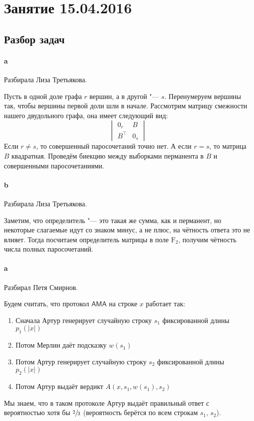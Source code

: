 \chapter{Занятие 15.04.2016}

\section{Разбор задач}
	\subsubsection{a}
	Разбирала Лиза Третьякова.

	Пусть в одной доле графа $r$ вершин, а в другой "--- $s$.
	Перенумеруем вершины так, чтобы вершины первой доли шли в начале.
	Рассмотрим матрицу смежности нашего двудольного графа, она имеет следующий вид:
	\[
		\begin{vmatrix}
			0_r & B \\
			B^{\top} & 0_s
		\end{vmatrix}
	\]
	Если $r\neq s$, то совершенный паросочетаний точно нет.
	А если $r=s$, то матрица $B$ квадратная.
	Проведём биекцию между выборками перманента в $B$ и совершенными паросочетаниями.
	\TODO

	\subsubsection{b}
	Разбирала Лиза Третьякова.

	Заметим, что определитель "--- это такая же сумма, как и перманент, но некоторые слагаемые
	идут со знаком минус, а не плюс, на чётность ответа это не влияет.
	Тогда посчитаем определитель матрицы в поле $\mathrm{F}_2$, получим чётность числа полных паросочетаний.

	\subsubsection{a}
	Разбирал Петя Смирнов.

	Будем считать, что протокол $\mathsf{AMA}$ на строке $x$ работает так:
	\begin{enumerate}
		\item
			Сначала Артур генерирует случайную строку $s_1$ фиксированной длины $p_1(|x|)$
		\item
			Потом Мерлин даёт подсказку $w(s_1)$
		\item
			Потом Артур генерирует случайную строку $s_2$ фиксированной длины $p_2(|x|)$
		\item
			Потом Артур выдаёт вердикт $A(x, s_1, w(s_1), s_2)$
	\end{enumerate}
	Мы знаем, что в таком протоколе Артур выдаёт правильный ответ с вероятностью хотя бы $\sfrac 23$
	(вероятность берётся по всем строкам $s_1$, $s_2$).

